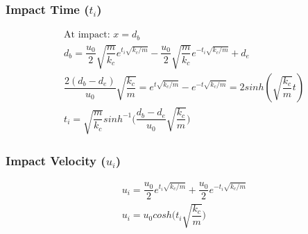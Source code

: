 \documentclass[a4paper,11pt,titlepage]{report}
\begin{document}
\subsubsection{Impact Time ($t_i$)}
\begin{align*}
&\text{At impact: } x = d_b \\
&d_b = \dfrac{u_0}{2} \sqrt{\dfrac{m}{k_c}} e^{t_i \sqrt{k_c / m}} - \dfrac{u_0}{2} \sqrt{\dfrac{m}{k_c}} e^{- t_i \sqrt{k_c / m}} + d_e \\
&\dfrac{2(d_b - d_e)}{u_0} \sqrt{\dfrac{k_c}{m}} = e^{t \sqrt{k_c / m}} - e^{-t \sqrt{k_c / m}}  = 2 sinh(\sqrt{\dfrac{k_c}{m}} t) \\
&t_i = \sqrt{\dfrac{m}{k_c}} sinh^{-1}\Bigg(\dfrac{d_b - d_e}{u_0} \sqrt{\dfrac{k_c}{m}}\Bigg)
\end{align*}
\subsubsection{Impact Velocity ($u_i$)}
\begin{align*}
&u_i = \dfrac{u_0}{2} e^{t_i \sqrt{k_c / m}} + \dfrac{u_0}{2} e^{- t_i \sqrt{k_c / m}} \\
&u_i = u_0 cosh\Big(t_i \sqrt{\dfrac{k_c}{m}}\Big)
\end{align*}
\end{document}
